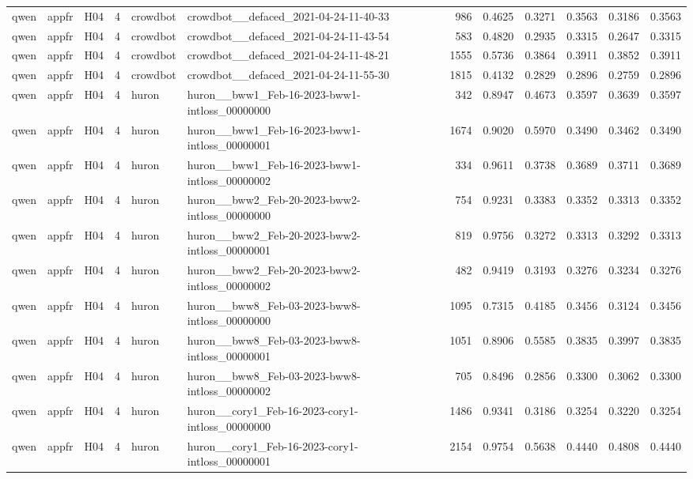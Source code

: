 \begin{table}[tbp]
\begin{tabular}{lllrllrrrrrr}
qwen & appfr & H04 & 4 & crowdbot & crowdbot\_\_defaced\_2021-04-24-11-40-33 & 986 & 0.4625 & 0.3271 & 0.3563 & 0.3186 & 0.3563 \\
qwen & appfr & H04 & 4 & crowdbot & crowdbot\_\_defaced\_2021-04-24-11-43-54 & 583 & 0.4820 & 0.2935 & 0.3315 & 0.2647 & 0.3315 \\
qwen & appfr & H04 & 4 & crowdbot & crowdbot\_\_defaced\_2021-04-24-11-48-21 & 1555 & 0.5736 & 0.3864 & 0.3911 & 0.3852 & 0.3911 \\
qwen & appfr & H04 & 4 & crowdbot & crowdbot\_\_defaced\_2021-04-24-11-55-30 & 1815 & 0.4132 & 0.2829 & 0.2896 & 0.2759 & 0.2896 \\
qwen & appfr & H04 & 4 & huron & huron\_\_bww1\_Feb-16-2023-bww1-intloss\_00000000 & 342 & 0.8947 & 0.4673 & 0.3597 & 0.3639 & 0.3597 \\
qwen & appfr & H04 & 4 & huron & huron\_\_bww1\_Feb-16-2023-bww1-intloss\_00000001 & 1674 & 0.9020 & 0.5970 & 0.3490 & 0.3462 & 0.3490 \\
qwen & appfr & H04 & 4 & huron & huron\_\_bww1\_Feb-16-2023-bww1-intloss\_00000002 & 334 & 0.9611 & 0.3738 & 0.3689 & 0.3711 & 0.3689 \\
qwen & appfr & H04 & 4 & huron & huron\_\_bww2\_Feb-20-2023-bww2-intloss\_00000000 & 754 & 0.9231 & 0.3383 & 0.3352 & 0.3313 & 0.3352 \\
qwen & appfr & H04 & 4 & huron & huron\_\_bww2\_Feb-20-2023-bww2-intloss\_00000001 & 819 & 0.9756 & 0.3272 & 0.3313 & 0.3292 & 0.3313 \\
qwen & appfr & H04 & 4 & huron & huron\_\_bww2\_Feb-20-2023-bww2-intloss\_00000002 & 482 & 0.9419 & 0.3193 & 0.3276 & 0.3234 & 0.3276 \\
qwen & appfr & H04 & 4 & huron & huron\_\_bww8\_Feb-03-2023-bww8-intloss\_00000000 & 1095 & 0.7315 & 0.4185 & 0.3456 & 0.3124 & 0.3456 \\
qwen & appfr & H04 & 4 & huron & huron\_\_bww8\_Feb-03-2023-bww8-intloss\_00000001 & 1051 & 0.8906 & 0.5585 & 0.3835 & 0.3997 & 0.3835 \\
qwen & appfr & H04 & 4 & huron & huron\_\_bww8\_Feb-03-2023-bww8-intloss\_00000002 & 705 & 0.8496 & 0.2856 & 0.3300 & 0.3062 & 0.3300 \\
qwen & appfr & H04 & 4 & huron & huron\_\_cory1\_Feb-16-2023-cory1-intloss\_00000000 & 1486 & 0.9341 & 0.3186 & 0.3254 & 0.3220 & 0.3254 \\
qwen & appfr & H04 & 4 & huron & huron\_\_cory1\_Feb-16-2023-cory1-intloss\_00000001 & 2154 & 0.9754 & 0.5638 & 0.4440 & 0.4808 & 0.4440 \\

\end{tabular}
\end{table}
